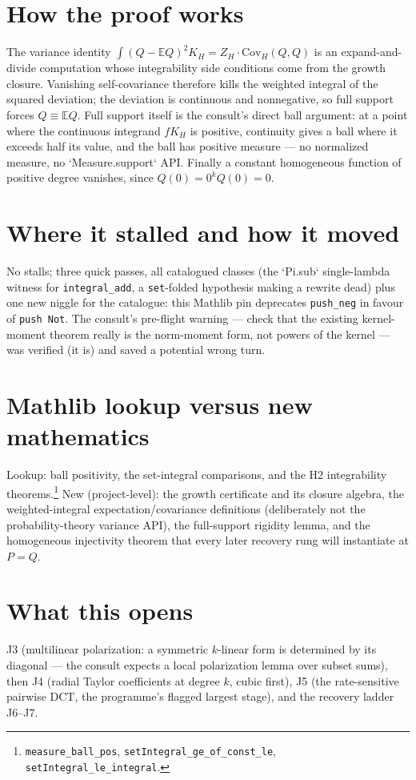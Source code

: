 \documentclass[11pt]{article}
\begin{document}
\section{How the proof works}

The variance identity
$\int (Q - \mathbb{E}Q)^2 K_H = Z_H \cdot \mathrm{Cov}_H(Q,Q)$
is an expand-and-divide computation whose integrability side
conditions come from the growth closure. Vanishing self-covariance
therefore kills the weighted integral of the squared deviation; the
deviation is continuous and nonnegative, so full support forces
$Q \equiv \mathbb{E}Q$. Full support itself is the consult's direct
ball argument: at a point where the continuous integrand $f K_H$ is
positive, continuity gives a ball where it exceeds half its value,
and the ball has positive measure --- no normalized measure, no
`Measure.support` API. Finally a constant homogeneous function of
positive degree vanishes, since $Q(0) = 0^k Q(0) = 0$.

\section{Where it stalled and how it moved}

No stalls; three quick passes, all catalogued classes (the
`Pi.sub` single-lambda witness for \texttt{integral\_add}, a
\texttt{set}-folded hypothesis making a rewrite dead) plus one new
niggle for the catalogue: this Mathlib pin deprecates
\texttt{push\_neg} in favour of \texttt{push Not}. The consult's
pre-flight warning --- check that the existing kernel-moment theorem
really is the norm-moment form, not powers of the kernel --- was
verified (it is) and saved a potential wrong turn.

\section{Mathlib lookup versus new mathematics}

Lookup: ball positivity, the set-integral comparisons, and the H2
integrability theorems.\footnote{\texttt{measure\_ball\_pos},
\texttt{setIntegral\_ge\_of\_const\_le},
\texttt{setIntegral\_le\_integral}.} New (project-level): the growth certificate and its
closure algebra, the weighted-integral expectation/covariance
definitions (deliberately not the probability-theory variance API),
the full-support rigidity lemma, and the homogeneous injectivity
theorem that every later recovery rung will instantiate at
$P = Q$.

\section{What this opens}

J3 (multilinear polarization: a symmetric $k$-linear form is
determined by its diagonal --- the consult expects a local
polarization lemma over subset sums), then J4 (radial Taylor
coefficients at degree $k$, cubic first), J5 (the rate-sensitive
pairwise DCT, the programme's flagged largest stage), and the
recovery ladder J6--J7.
\end{document}
